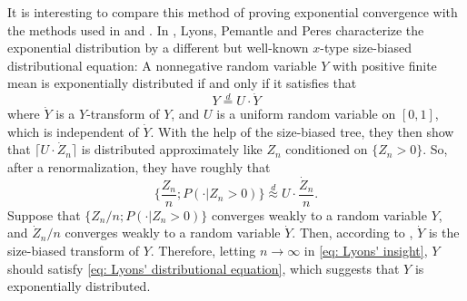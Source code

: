 \documentclass[UTF8]{pkuthss}
\theoremstyle{plain}
\theoremstyle{definition}
\numberwithin{equation}{section}
\begin{document}
It is interesting to compare this method of proving exponential convergence with the methods
used in \cite{Geiger2000A-new} and \cite{LyonsPemantlePeres1995Conceptual}.
In \cite{LyonsPemantlePeres1995Conceptual}, Lyons, Pemantle and Peres characterize the exponential distribution by a different
but well-known $x$-type size-biased distributional equation:
A nonnegative random variable $Y$ with positive finite mean is exponentially distributed if and only if it satisfies that
\begin{equation}
\label{eq: Lyons' distributional equation}
Y 		\overset{d}= U \cdot \dot Y
\end{equation}
	where $\dot Y$ is a $Y$-transform of $Y$,  and $U$ is a uniform random variable on $[0,1]$, which is independent of $\dot Y$.
	With the help of the size-biased tree,
	they then show that $\lceil U \cdot \dot Z_n \rceil$ is distributed approximately like $Z_n$ conditioned on $\{Z_n > 0\}$.
	So, after a renormalization, they have roughly that
\begin{equation}
\label{eq: Lyons' insight}
\Big\{\frac{Z_n}{n} ; P(  \cdot| Z_n > 0) \Big\}
\overset{d}{\approx} U \cdot \frac{ \dot Z_n}{n}.
\end{equation}
	Suppose that $\{Z_n/n; P(\cdot | Z_n > 0)\}$ converges weakly to a random variable $Y$, and $\dot Z_n /n$ converges weakly to a random variable $\dot Y$.
	Then, according to \cite[Lemma 4.3]{LyonsPemantlePeres1995Conceptual}, $\dot Y$ is the size-biased transform of $Y$.
	Therefore, letting $n\to \infty$ in \eqref{eq: Lyons' insight},
	$Y$ should satisfy \eqref{eq: Lyons' distributional equation}, which suggests that $Y$ is exponentially distributed.
\end{document}
